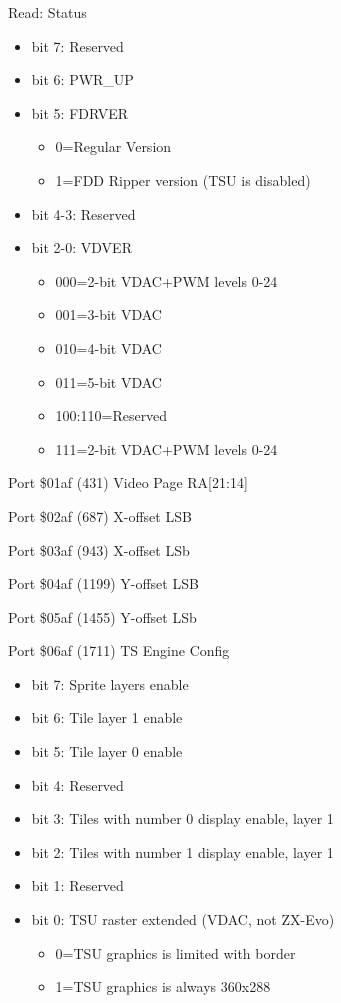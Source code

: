 Read: Status
\begin{itemize}
\item[] bit 7: Reserved
\item[] bit 6: PWR\_UP
\item[] bit 5: FDRVER
  \begin{itemize}
  \item[] 0=Regular Version
  \item[] 1=FDD Ripper version (TSU is disabled)
  \end{itemize}
\item[] bit 4-3: Reserved
\item[] bit 2-0: VDVER
  \begin{itemize}
  \item[] 000=2-bit VDAC+PWM levels 0-24
  \item[] 001=3-bit VDAC
  \item[] 010=4-bit VDAC
  \item[] 011=5-bit VDAC
  \item[] 100:110=Reserved
  \item[] 111=2-bit VDAC+PWM levels 0-24
  \end{itemize}
\end{itemize}

Port \$01af (431) Video Page
RA[21:14]

Port \$02af (687) X-offset LSB

Port \$03af (943) X-offset LSb

Port \$04af (1199) Y-offset LSB

Port \$05af (1455) Y-offset LSb

Port \$06af (1711) TS Engine Config
\begin{itemize}
\item[] bit 7: Sprite layers enable
\item[] bit 6: Tile layer 1 enable
\item[] bit 5: Tile layer 0 enable
\item[] bit 4: Reserved
\item[] bit 3: Tiles with number 0 display enable, layer 1
\item[] bit 2: Tiles with number 1 display enable, layer 1
\item[] bit 1: Reserved
\item[] bit 0: TSU raster extended (VDAC, not ZX-Evo)
  \begin{itemize}
  \item[] 0=TSU graphics is limited with border
  \item[] 1=TSU graphics is always 360x288
  \end{itemize}
\end{itemize}

